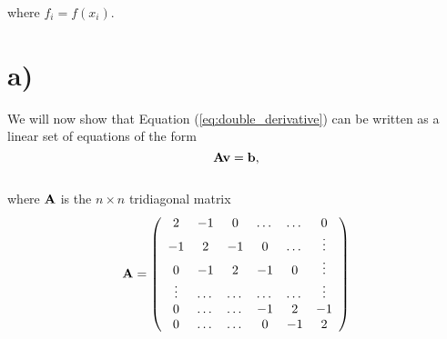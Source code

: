 \documentclass[12pt]{article}
\begin{document}
\begin{flushleft}
where $f_i=f(x_i)$.

\section*{a)}
We will now show that Equation (\ref{eq:double_derivative}) can be written as a linear set of equations of the form\\

\begin{equation}\label{eq:matrix_eq}
{\bf A}{\bf v} = {\bf b},
\end{equation}\\

where ${\bf A}$ is the $n\times n$  tridiagonal matrix\\
 \vspace{5mm}
$${\bf A} = 
    \left(\begin{array}{cccccc}
    2& -1& 0 &\dots   & \dots &0 \\
    -1 & 2 & -1 &0 &\dots &\vdots \\
     0&-1 &2 & -1 & 0 & \vdots \\
     \vdots & \dots   & \dots &\dots   &\dots & \vdots \\
     0&\dots   &\dots  &-1 &2& -1 \\
     0&\dots    &\dots  & 0  &-1 & 2 \\
    \end{array} \right)$$\\
    
\vspace{5mm}


\end{flushleft}
\end{document}
